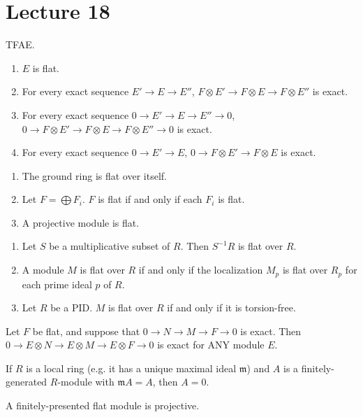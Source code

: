 \section{Lecture 18}
\begin{definition}[Flatness]
    TFAE.
    \begin{enumerate}
        \item $E$ is flat.
        \item For every exact sequence $E' \to E \to E''$, $F \otimes E' \to F \otimes E \to F \otimes E''$ is exact.
        \item For every exact sequence $0 \to E' \to E \to E'' \to 0$, $0 \to F \otimes E' \to F \otimes E \to F \otimes E'' \to 0$ is exact.
        \item For every exact sequence $0 \to E' \to E$, $0 \to F \otimes E' \to F \otimes E $ is exact.
    \end{enumerate}
\end{definition}

\begin{theorem}
    \begin{enumerate}
        \item The ground ring is flat over itself.
        \item Let $F = \bigoplus F_i$. $F$ is flat if and only if each $F_i$ is flat.
        \item A projective module is flat.
    \end{enumerate}
\end{theorem}

\begin{theorem}
    \begin{enumerate}
        \item Let $S$ be a multiplicative subset of $R$. Then $S^{-1}R$ is flat over $R$.
        \item A module $M$ is flat over $R$ if and only if the localization $M_{p}$ is flat over $R_p$ for each prime ideal $p$ of $R$.
        \item Let $R$ be a PID. $M$ is flat over $R$ if and only if it is torsion-free.
    \end{enumerate}
\end{theorem}

\begin{theorem}
    Let $F$ be flat, and suppose that $0 \to N \to M \to F \to 0$ is exact.
    Then $0 \to E \otimes N \to E \otimes M \to E \otimes F \to 0$ is exact for ANY module $E$.
\end{theorem}

\begin{theorem}[Nakayama]
    If $R$ is a local ring (e.g. it has a unique maximal ideal $\mathfrak{m}$)
    and $A$ is a finitely-generated $R$-module with $\mathfrak{m}A = A$, then $A = 0$.
\end{theorem}

\begin{theorem}
    A finitely-presented flat module is projective.
\end{theorem}